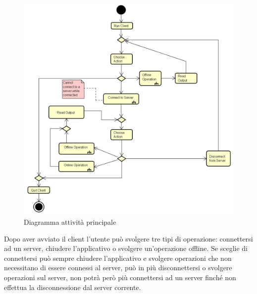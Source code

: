 \documentclass[a4paper]{article}
\begin{document}
		\begin{figure} [H]
			\centering
			\includegraphics[scale=0.6]{ST/client/diagramma-attivita-generale.png}
			\caption{Diagramma attività principale}
		\end{figure}
			Dopo aver avviato il client l'utente può svolgere tre tipi di operazione: connettersi ad un server, chiudere l'applicativo o svolgere un'operazione offline. Se sceglie di connettersi può sempre chiudere l'applicativo e svolgere operazioni che non necessitano di essere connessi al server, può in più disconnettersi o svolgere operazioni sul server, non potrà però più connettersi ad un server finché non effettua la disconnessione dal server corrente.
			
\end{document}
